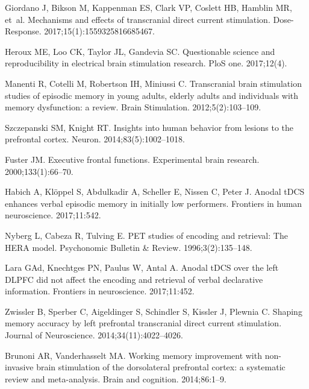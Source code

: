 \documentclass[10pt,letterpaper]{article}
\begin{document}
\begin{thebibliography}{10}
Giordano J, Bikson M, Kappenman ES, Clark VP, Coslett HB, Hamblin MR, et~al.
\newblock Mechanisms and effects of transcranial direct current stimulation.
\newblock Dose-Response. 2017;15(1):1559325816685467.

Heroux ME, Loo CK, Taylor JL, Gandevia SC.
\newblock Questionable science and reproducibility in electrical brain
  stimulation research.
\newblock PloS one. 2017;12(4).

Manenti R, Cotelli M, Robertson IH, Miniussi C.
\newblock Transcranial brain stimulation studies of episodic memory in young
  adults, elderly adults and individuals with memory dysfunction: a review.
\newblock Brain Stimulation. 2012;5(2):103--109.

Szczepanski SM, Knight RT.
\newblock Insights into human behavior from lesions to the prefrontal cortex.
\newblock Neuron. 2014;83(5):1002--1018.

Fuster JM.
\newblock Executive frontal functions.
\newblock Experimental brain research. 2000;133(1):66--70.

Habich A, Kl{\"o}ppel S, Abdulkadir A, Scheller E, Nissen C, Peter J.
\newblock Anodal tDCS enhances verbal episodic memory in initially low
  performers.
\newblock Frontiers in human neuroscience. 2017;11:542.

Nyberg L, Cabeza R, Tulving E.
\newblock PET studies of encoding and retrieval: The HERA model.
\newblock Psychonomic Bulletin \& Review. 1996;3(2):135--148.

Lara GAd, Knechtges PN, Paulus W, Antal A.
\newblock Anodal tDCS over the left DLPFC did not affect the encoding and
  retrieval of verbal declarative information.
\newblock Frontiers in neuroscience. 2017;11:452.

Zwissler B, Sperber C, Aigeldinger S, Schindler S, Kissler J, Plewnia C.
\newblock Shaping memory accuracy by left prefrontal transcranial direct
  current stimulation.
\newblock Journal of Neuroscience. 2014;34(11):4022--4026.

Brunoni AR, Vanderhasselt MA.
\newblock Working memory improvement with non-invasive brain stimulation of the
  dorsolateral prefrontal cortex: a systematic review and meta-analysis.
\newblock Brain and cognition. 2014;86:1--9.


\end{thebibliography}
\end{document}
